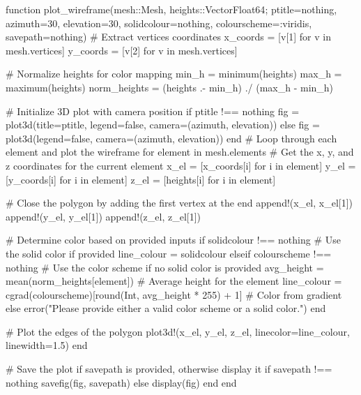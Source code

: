 \begin{jllisting}[style=JuliaStyle]
function plot_wireframe(mesh::Mesh, heights::Vector{Float64}; ptitle=nothing, azimuth=30, elevation=30, solidcolour=nothing, colourscheme=:viridis, savepath=nothing)
    # Extract vertices coordinates
    x_coords = [v[1] for v in mesh.vertices]
    y_coords = [v[2] for v in mesh.vertices]

    # Normalize heights for color mapping
    min_h = minimum(heights)
    max_h = maximum(heights)
    norm_heights = (heights .- min_h) ./ (max_h - min_h)

    # Initialize 3D plot with camera position
    if ptitle !== nothing
        fig = plot3d(title=ptitle, legend=false, camera=(azimuth, elevation))
    else
        fig = plot3d(legend=false, camera=(azimuth, elevation))
    end
    # Loop through each element and plot the wireframe
    for element in mesh.elements
        # Get the x, y, and z coordinates for the current element
        x_el = [x_coords[i] for i in element]
        y_el = [y_coords[i] for i in element]
        z_el = [heights[i] for i in element]

        # Close the polygon by adding the first vertex at the end
        append!(x_el, x_el[1])
        append!(y_el, y_el[1])
        append!(z_el, z_el[1])

        # Determine color based on provided inputs
        if solidcolour !== nothing
            # Use the solid color if provided
            line_colour = solidcolour
        elseif colourscheme !== nothing
            # Use the color scheme if no solid color is provided
            avg_height = mean(norm_heights[element])  # Average height for the element
            line_colour = cgrad(colourscheme)[round(Int, avg_height * 255) + 1]  # Color from gradient
        else
            error("Please provide either a valid color scheme or a solid color.")
        end

        # Plot the edges of the polygon
        plot3d!(x_el, y_el, z_el, linecolor=line_colour, linewidth=1.5)
    end

    # Save the plot if savepath is provided, otherwise display it
    if savepath !== nothing
        savefig(fig, savepath)
    else
        display(fig)
    end
end
\end{jllisting}


